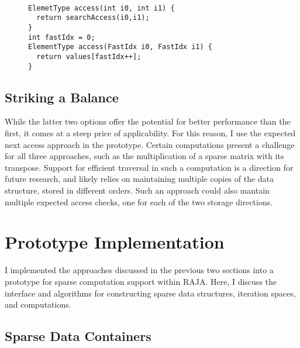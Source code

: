 \begin{figure}
\begin{lstlisting}[caption={Reference implementation for the Specialized Index Types approach.}, label=specializedIndexImp]

ElemetType access(int i0, int i1) {
  return searchAccess(i0,i1);
}
int fastIdx = 0;
ElementType access(FastIdx i0, FastIdx i1) {
  return values[fastIdx++];
}
\end{lstlisting}
\end{figure}

\subsection{Striking a Balance}
While the latter two options offer the potential for better performance than the first, it comes at a steep price of applicability.
For this reason, I use the expected next access approach in the prototype.
Certain computations present a challenge for all three approaches, such as the multiplication of a sparse matrix with its transpose.
Support for efficient traversal in such a computation is a direction for future research, and likely relies on maintaining multiple copies of the data structure, stored in different orders.
Such an approach could also mantain multiple expected access checks, one for each of the two storage directions.

\section{Prototype Implementation}

I implemented the approaches discussed in the previous two sections into a prototype for sparse computation support within RAJA.
Here, I discuss the interface and algorithms for constructing sparse data structures, iteration spaces, and computations.

\subsection{Sparse Data Containers}

